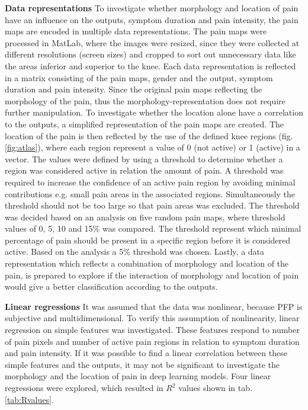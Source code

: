 \noindent
\textbf{Data representations} \newline
\noindent
To investigate whether morphology and location of pain have an influence on the outputs, symptom duration and pain intensity, the pain maps are encoded in multiple data representations. The pain maps were processed in MatLab, where the images were resized, since they were collected at different resolutions (screen sizes) and cropped to sort out unnecessary data like the areas inferior and superior to the knee.  Each data representation is reflected in a matrix consisting of the pain maps, gender and the output, symptom duration and pain intensity. Since the original pain maps reflecting the morphology of the pain, thus the morphology-representation does not require further manipulation. \newline
\noindent
To investigate whether the location alone have a correlation to the outputs, a simplified representation of the pain maps are created. The location of the pain is then reflected by the use of the defined knee regions (fig. \ref{fig:atlas}), where each region represent a value of 0 (not active) or 1 (active) in a vector.  The values were defined by using a threshold to determine whether a region was considered active in relation the amount of pain. A threshold was required to increase the confidence of an active pain region by avoiding minimal contributions e.g. small pain areas in the associated regions. Simultaneously the threshold should not be too large so that pain areas was excluded. The threshold was decided based on an analysis on five random pain maps, where threshold values of 0, 5, 10 and 15\% was compared. The threshold represent which minimal percentage of pain should be present in a specific region before it is considered active. Based on the analysis a 5\% threshold was chosen. \newline
\noindent
Lastly, a data representation which reflects a combination of morphology and location of the pain, is prepared to explore if the interaction of morphology and location of pain would give a better classification according to the outputs. \newline

\noindent
\textbf{Linear regressions} \newline
\noindent
It was assumed that the data was nonlinear, because PFP is subjective and multidimensional. To verify this assumption of nonlinearity, linear regression on simple features was investigated. These features respond to number of pain pixels and number of active pain regions in relation to symptom duration and pain intensity. If it was possible to find a linear correlation between these simple features and the outputs, it may not be significant to investigate the morphology and the location of pain in deep learning models. Four linear regressions were explored, which resulted in $R^2$ values shown in tab. \ref{tab:Rvalues}.

